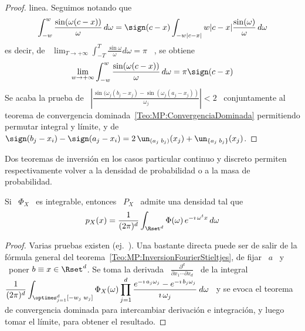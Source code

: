 {\begin{proof}
  linea. Seguimos notando que
  \[
  \int_{-w}^w  \frac{\sin(\omega (c  - x))}{\omega}  \, d\omega  = \sign(c  - x)
  \int_{-w |c - x|}{w |c - x|} \frac{\sin(\omega)}{\omega} \, d\omega
  \]
  es  decir, de  \ $\displaystyle  \lim_{T \to  +\infty}  \int_{-T}^T \frac{\sin
    \omega}{\omega} d\omega = \pi$ \ \cite[Ec.~3.721]{GraRyz15}, se obtiene
  \[
  \lim_{w \to  +\infty} \int_{-w}^w \frac{\sin(\omega  (c - x))}{\omega}
  \, d\omega = \pi \sign(c-x)
  \]
  Se  acaba  la   prueba  de  \  $\left|  \frac{\sin(\omega_j   (b_j  -  x_j)  -
      \sin(\omega_j  (a_j -  x_j))}{\omega_j} \right|  < 2$  \  conjuntamente al
  teorema de convergencia dominada~\ref{Teo:MP:ConvergenciaDominada} permitiendo
  permutar integral  y l\'imite,  y de $\sign(b_j-x_i)  - \sign(a_j-x_i) =  2 \,
  \un_{\left(   a_j   \;  b_j   \right)}(x_j)   +   \un_{\left\{   a_j  \;   b_j
    \right\}}(x_j)$.
\end{proof}

Dos teoremas de inversi\'on en los casos particular continuo y discreto permiten
respectivamente  volver  a   la  densidad  de  probabilidad  o   a  la  masa  de
probabilidad.
%
\begin{teorema}\label{Teo:MP:InversionDensidad}
%
  Si \ $\Phi_X$ \ es integrable, entonces \ $P_X$ \ admite una densidad tal que
  \[
  p_X(x)  =  \frac{1}{(2  \pi)^d}  \int_{\Rset^d} \Phi(\omega) \, e^{-  \imath  \,
    \omega^t x} \, d\omega
\]
\end{teorema}
%
\begin{proof}
  Varias pruebas  existen (ej.~\cite[p.~21]{Sas13}). Una  bastante directa puede
  ser       de      salir      de       la      f\'ormula       general      del
  teorema~\ref{Teo:MP:InversionFourierStieltjes}, de  fijar \ $a$ \ y  \ poner $b
  \equiv x \in  \Rset^d$. Se toma la derivada  \ $\frac{\partial^d}{\partial x_1
    \cdots \partial x_d}$ \ de  la integral \ $\displaystyle \frac{1}{(2 \pi)^d}
  \int_{\optimes_{j=1}^d   [-w_j  \;  w_j]}   \Phi_X(\omega)  \prod_{j   =  1}^d
  \frac{e^{- \imath \,  a_j \omega_j} - e^{- \imath  \, b_j \omega_j}}{\imath \,
    \omega_j} \: d\omega$ \ y se  evoca el teorema de convergencia dominada para
  intercambiar  derivaci\'on e integraci\'on,  y luego  tomar el  l\'imite, para
  obtener el resultado.
\end{proof}

}
